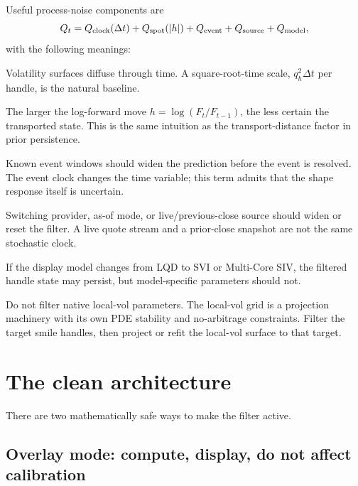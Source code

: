 \documentclass[11pt]{article}
\begin{document}
Useful process-noise components are
\[
Q_t=Q_{\mathrm{clock}}(\Delta t)+Q_{\mathrm{spot}}(\lvert h\rvert)
+Q_{\mathrm{event}}+Q_{\mathrm{source}}+Q_{\mathrm{model}},
\label{eq:Q}
\]
with the following meanings:
\begin{description}[leftmargin=1.7em,style=nextline]
\item[Clock noise.]
Volatility surfaces diffuse through time. A square-root-time scale,
$q_h^2\Delta t$ per handle, is the natural baseline.
\item[Spot transport noise.]
The larger the log-forward move $h=\log(F_t/F_{t-1})$, the less certain the
transported state. This is the same intuition as the transport-distance factor
in prior persistence.
\item[Event noise.]
Known event windows should widen the prediction before the event is resolved.
The event clock changes the time variable; this term admits that the shape
response itself is uncertain.
\item[Source noise.]
Switching provider, as-of mode, or live/previous-close source should widen or
reset the filter. A live quote stream and a prior-close snapshot are not the
same stochastic clock.
\item[Model noise.]
If the display model changes from LQD to SVI or Multi-Core SIV, the filtered
handle state may persist, but model-specific parameters should not.
\end{description}

\begin{caution}
Do not filter native local-vol parameters. The local-vol grid is a projection
machinery with its own PDE stability and no-arbitrage constraints. Filter the
target smile handles, then project or refit the local-vol surface to that target.
\end{caution}

\section{The clean architecture}
\label{sec:architecture}

There are two mathematically safe ways to make the filter active.

\subsection{Overlay mode: compute, display, do not affect calibration}
\end{document}
